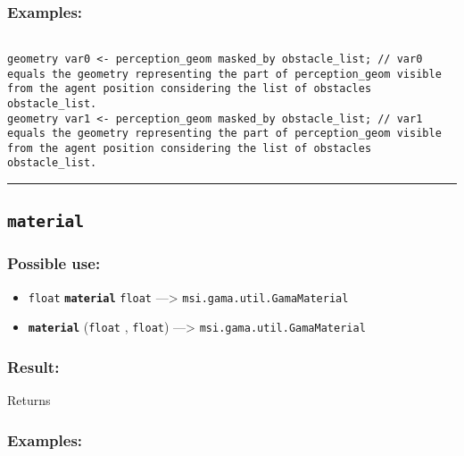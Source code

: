 \documentclass[]{book}
\providecommand{\tightlist}{%
  \setlength{\itemsep}{0pt}\setlength{\parskip}{0pt}}
\theoremstyle{definition}
\theoremstyle{definition}
\theoremstyle{definition}
\theoremstyle{remark}
\begin{document}
\subsubsection{Examples:}\label{examples-231}

\begin{verbatim}
 
geometry var0 <- perception_geom masked_by obstacle_list; // var0 equals the geometry representing the part of perception_geom visible from the agent position considering the list of obstacles obstacle_list. 
geometry var1 <- perception_geom masked_by obstacle_list; // var1 equals the geometry representing the part of perception_geom visible from the agent position considering the list of obstacles obstacle_list.
\end{verbatim}

\begin{center}\rule{0.5\linewidth}{\linethickness}\end{center}

\subsection{\texorpdfstring{\texttt{material}}{material}}\label{material}

\subsubsection{Possible use:}\label{possible-use-335}

\begin{itemize}
\tightlist
\item
  \texttt{float} \textbf{\texttt{material}} \texttt{float}
  ---\textgreater{} \texttt{msi.gama.util.GamaMaterial}
\item
  \textbf{\texttt{material}} (\texttt{float} , \texttt{float})
  ---\textgreater{} \texttt{msi.gama.util.GamaMaterial}
\end{itemize}

\subsubsection{Result:}\label{result-324}

Returns

\subsubsection{Examples:}\label{examples-232}
\end{document}
